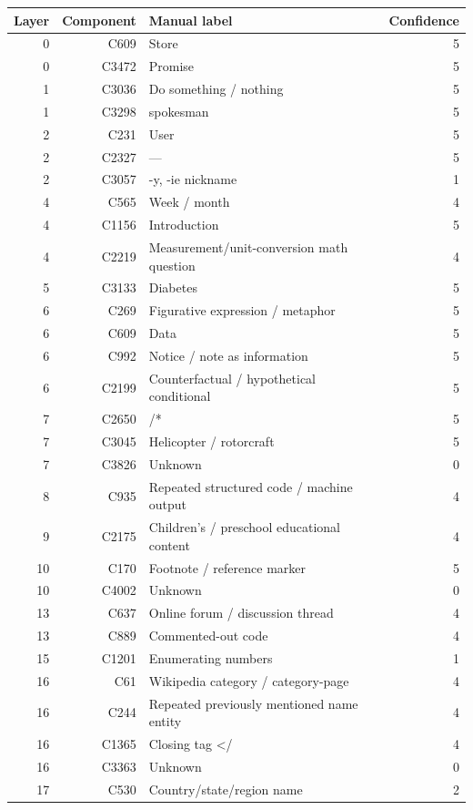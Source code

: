 \begin{tabular}{@{}rrp{}r@{}}
  \toprule
  Layer & Component & Manual label & Confidence \\
  \midrule
  0 & C609 & Store & 5 \\
  0 & C3472 & Promise & 5 \\
  1 & C3036 & Do something / nothing & 5 \\
  1 & C3298 & spokesman & 5 \\
  2 & C231 & User & 5 \\
  2 & C2327 & --- & 5 \\
  2 & C3057 & -y, -ie nickname & 1 \\
  4 & C565 & Week / month & 4 \\
  4 & C1156 & Introduction & 5 \\
  4 & C2219 & Measurement/unit-conversion math question & 4 \\
  5 & C3133 & Diabetes & 5 \\
  6 & C269 & Figurative expression / metaphor & 5 \\
  6 & C609 & Data & 5 \\
  6 & C992 & Notice / note as information & 5 \\
  6 & C2199 & Counterfactual / hypothetical conditional & 5 \\
  7 & C2650 & /* & 5 \\
  7 & C3045 & Helicopter / rotorcraft & 5 \\
  7 & C3826 & Unknown & 0 \\
  8 & C935 & Repeated structured code / machine output & 4 \\
  9 & C2175 & Children's / preschool educational content & 4 \\
  10 & C170 & Footnote / reference marker & 5 \\
  10 & C4002 & Unknown & 0 \\
  13 & C637 & Online forum / discussion thread & 4 \\
  13 & C889 & Commented-out code & 4 \\
  15 & C1201 & Enumerating numbers & 1 \\
  16 & C61 & Wikipedia category / category-page & 4 \\
  16 & C244 & Repeated previously mentioned name entity & 4 \\
  16 & C1365 & Closing tag </ & 4 \\
  16 & C3363 & Unknown & 0 \\
  17 & C530 & Country/state/region name & 2 \\

\end{tabular}
